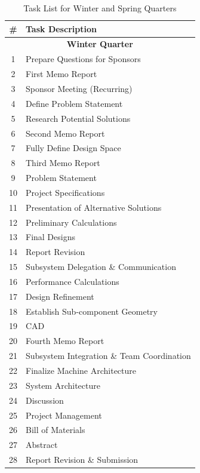 \documentclass[12pt, letterpaper]{report}%
\begin{document}

\begin{table}[h]
\caption{Task List for Winter and Spring Quarters}
\centering
\begin{tabular}{@{} c l @{}}
\toprule
\textbf{\#} & \textbf{Task Description} \\
\midrule
\multicolumn{2}{c}{\textbf{Winter Quarter}} \\
\midrule
1  & Prepare Questions for Sponsors \\
2  & First Memo Report \\
3  & Sponsor Meeting (Recurring) \\
4  & Define Problem Statement \\
5  & Research Potential Solutions \\
6  & Second Memo Report \\
7  & Fully Define Design Space \\
8  & Third Memo Report \\
9  & Problem Statement \\
10 & Project Specifications \\
11 & Presentation of Alternative Solutions \\
12 & Preliminary Calculations \\
13 & Final Designs \\
14 & Report Revision \\
15 & Subsystem Delegation \& Communication \\
16 & Performance Calculations \\
17 & Design Refinement \\
18 & Establish Sub-component Geometry \\
19 & CAD \\
20 & Fourth Memo Report \\
21 & Subsystem Integration \& Team Coordination \\
22 & Finalize Machine Architecture \\
23 & System Architecture \\
24 & Discussion \\
25 & Project Management \\
26 & Bill of Materials \\
27 & Abstract \\
28 & Report Revision \& Submission \\
\bottomrule
\end{tabular}
\end{table}

\newpage
\end{document}
